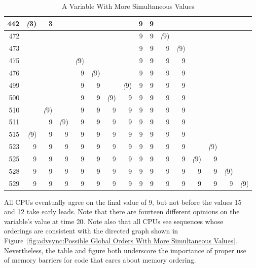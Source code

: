 \begin{table}[htbp]
\begin{tabular}{r||r|r|r|r|r|r|r|r|r|r|r|r|r|r|r}
\hline
442  & \emph(3) & 3 & ~ & ~ & ~ & ~ & ~ & 9 & 9 & ~ & ~ & ~ & ~ & ~ & ~ \\
\hline
472  & ~ & ~ & ~ & ~ & ~ & ~ & ~ & 9 & 9 & \emph(9) & ~ & ~ & ~ & ~ & ~ \\
\hline
473  & ~ & ~ & ~ & ~ & ~ & ~ & ~ & 9 & 9 & 9 & \emph(9) & ~ & ~ & ~ & ~ \\
\hline
475  & ~ & ~ & ~ & \emph(9) & ~ & ~ & ~ & 9 & 9 & 9 & 9 & ~ & ~ & ~ & ~ \\
\hline
476  & ~ & ~ & ~ & 9 & \emph(9) & ~ & ~ & 9 & 9 & 9 & 9 & ~ & ~ & ~ & ~ \\
\hline
499  & ~ & ~ & ~ & 9 & 9 & ~ & \emph(9) & 9 & 9 & 9 & 9 & ~ & ~ & ~ & ~ \\
\hline
500  & ~ & ~ & ~ & 9 & 9 & \emph(9) & 9 & 9 & 9 & 9 & 9 & ~ & ~ & ~ & ~ \\
\hline
510  & ~ & \emph(9) & ~ & 9 & 9 & 9 & 9 & 9 & 9 & 9 & 9 & ~ & ~ & ~ & ~ \\
\hline
511  & ~ & 9 & \emph(9) & 9 & 9 & 9 & 9 & 9 & 9 & 9 & 9 & ~ & ~ & ~ & ~ \\
\hline
515  & \emph(9) & 9 & 9 & 9 & 9 & 9 & 9 & 9 & 9 & 9 & 9 & ~ & ~ & ~ & ~ \\
\hline
523  & 9 & 9 & 9 & 9 & 9 & 9 & 9 & 9 & 9 & 9 & 9 & ~ & \emph(9) & ~ & ~ \\
\hline
525  & 9 & 9 & 9 & 9 & 9 & 9 & 9 & 9 & 9 & 9 & 9 & \emph(9) & 9 & ~ & ~ \\
\hline
528  & 9 & 9 & 9 & 9 & 9 & 9 & 9 & 9 & 9 & 9 & 9 & 9 & 9 & \emph(9) & ~ \\
\hline
529  & 9 & 9 & 9 & 9 & 9 & 9 & 9 & 9 & 9 & 9 & 9 & 9 & 9 & 9 & \emph(9) \\
\end{tabular}
\caption{A Variable With More Simultaneous Values}
\label{tab:advsync:A Variable With More Simultaneous Values}
\end{table}

All CPUs eventually agree on the final value of 9, but not before
the values 15 and 12 take early leads.
Note that there are fourteen different opinions on the variable's value
at time 20.
Note also that all CPUs see sequences whose orderings are consistent with
the directed graph shown in
Figure~\ref{fig:advsync:Possible Global Orders With More Simultaneous Values}.
Nevertheless, the table and figure both underscore the importance of
proper use of memory barriers for code that cares about memory ordering.

